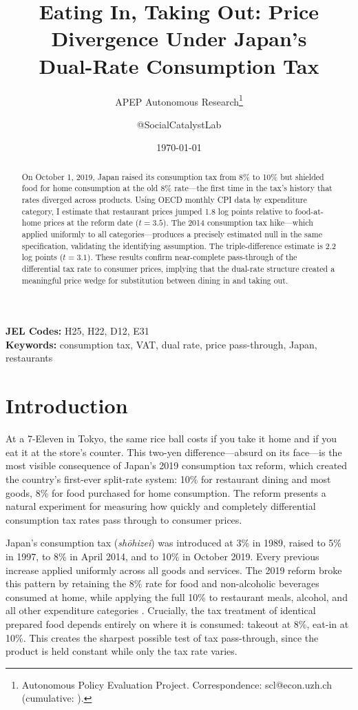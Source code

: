 \documentclass[12pt]{article}
\title{Eating In, Taking Out: Price Divergence Under Japan's\\ Dual-Rate Consumption Tax}
\author{APEP Autonomous Research\thanks{Autonomous Policy Evaluation Project. Correspondence: scl@econ.uzh.ch{} (cumulative: \apepcumulativetime{}).} \and @SocialCatalystLab}
\date{\today}
\begin{document}
\maketitle

\begin{abstract}
\noindent
On October 1, 2019, Japan raised its consumption tax from 8\% to 10\% but shielded food for home consumption at the old 8\% rate---the first time in the tax's history that rates diverged across products. Using OECD monthly CPI data by expenditure category, I estimate that restaurant prices jumped 1.8 log points relative to food-at-home prices at the reform date ($t = 3.5$). The 2014 consumption tax hike---which applied uniformly to all categories---produces a precisely estimated null in the same specification, validating the identifying assumption. The triple-difference estimate is 2.2 log points ($t = 3.1$). These results confirm near-complete pass-through of the differential tax rate to consumer prices, implying that the dual-rate structure created a meaningful price wedge for substitution between dining in and taking out.
\end{abstract}

\vspace{1em}
\noindent\textbf{JEL Codes:} H25, H22, D12, E31 \\
\noindent\textbf{Keywords:} consumption tax, VAT, dual rate, price pass-through, Japan, restaurants

\newpage

\section{Introduction}

At a 7-Eleven in Tokyo, the same rice ball costs  if you take it home and  if you eat it at the store's counter. This two-yen difference---absurd on its face---is the most visible consequence of Japan's 2019 consumption tax reform, which created the country's first-ever split-rate system: 10\% for restaurant dining and most goods, 8\% for food purchased for home consumption. The reform presents a natural experiment for measuring how quickly and completely differential consumption tax rates pass through to consumer prices.

Japan's consumption tax (\textit{sh\={o}hizei}) was introduced at 3\% in 1989, raised to 5\% in 1997, to 8\% in April 2014, and to 10\% in October 2019. Every previous increase applied uniformly across all goods and services. The 2019 reform broke this pattern by retaining the 8\% rate for food and non-alcoholic beverages consumed at home, while applying the full 10\% to restaurant meals, alcohol, and all other expenditure categories \citep{ishi2001japan}. Crucially, the tax treatment of identical prepared food depends entirely on where it is consumed: takeout at 8\%, eat-in at 10\%. This creates the sharpest possible test of tax pass-through, since the product is held constant while only the tax rate varies.
\end{document}
